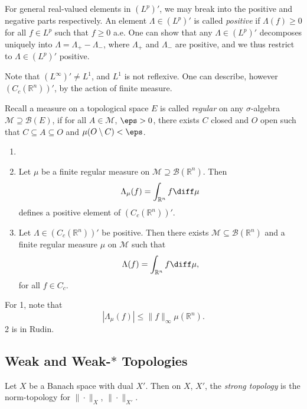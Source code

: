 \documentclass[12pt]{article}
\begin{document}
For general real-valued elements in $(L^p)'$, we may break into the positive and negative parts respectively. An element $\Lambda \in (L^p)'$ is called \emph{positive} if $\Lambda(f) \geq 0$ for all $f \in L^p$ such that $f \geq 0$ a.e. One can show that any $\Lambda \in (L^p)'$ decomposes uniquely into $\Lambda = \Lambda_+ - \Lambda_-$, where $\Lambda_+$ and $\Lambda_-$ are positive, and we thus restrict to $\Lambda \in (L^p)'$ positive.

Note that $(L^\infty)' \neq L^1$, and $L^1$ is not reflexive. One can describe, however $(C_c(\mathbb{R}^n))'$, by the action of finite measure.

Recall a measure on a topological space $E$ is called \emph{regular} on any $\sigma$-algebra $\mathcal{M} \supseteq \mathcal{B}(E)$, if for all $A \in \mathcal{M}$, $\eps > 0$, there exists $C$ closed and $O$ open such that $C \subseteq A \subseteq O$ and $\mu(O \setminus C) < \eps$.

\begin{theorem}
	\begin{enumerate}
		\item[]
		\item Let $\mu$ be a finite regular measure on $\mathcal{M} \supseteq \mathcal{B}(\mathbb{R}^n)$. Then
			\[
			\Lambda_\mu(f) = \int_{\mathbb{R}^n} f \diff \mu
			\]
			defines a positive element of $(C_c(\mathbb{R}^n))'$.
		\item Let $\Lambda \in (C_c(\mathbb{R}^n))'$ be positive. Then there exists $\mathcal{M} \subseteq \mathcal{B}(\mathbb{R}^n)$ and a finite regular measure $\mu$ on $\mathcal{M}$ such that
			\[
			\Lambda(f) = \int_{\mathbb{R}^n} f \diff \mu,
			\]
			for all $f \in C_c.$
	\end{enumerate}
\end{theorem}

\begin{proofbox}


	For 1, note that
	\[
	|\Lambda_\mu(f)| \leq \|f\|_{\infty} \mu(\mathbb{R}^n).
	\]
	2 is in Rudin.
\end{proofbox}


\subsection{Weak and Weak\texorpdfstring{-$\ast$}{ Star} Topologies}
\label{sub:weak_top}

Let $X$ be a Banach space with dual $X'$. Then on $X$, $X'$, the \emph{strong topology} is the norm-topology for $\|\cdot\|_{X}$, $\|\cdot\|_{X'}$.
\end{document}
